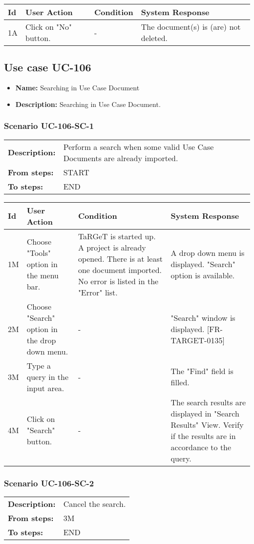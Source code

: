 \documentclass[a4paper,11pt]{article}
\newcommand{\bl}{\\ \hline}
\begin{document}
\begin{tabular}{|p{0.8in}|p{1.6in}|p{1.6in}|p{1.6in}|}
\hline
Id & User Action & Condition & System Response  \bl 
1A & Click on "No" button. & - & The document(s) is (are) not deleted. \bl 
\end{tabular}
\subsection*{Use case UC-106}
\begin{itemize}
\item {\bf Name: }Searching in Use Case Document
\item {\bf Description: }Searching in Use Case Document.
\end{itemize}
\subsubsection*{Scenario UC-106-SC-1}
\begin{tabular}{p{1in}p{4in}}
{\bf Description:} & Perform a search when some valid Use Case Documents are already imported. \\
{\bf From steps:} & START \\
{\bf To steps:} & END \\
\end{tabular}
 
\begin{tabular}{|p{0.8in}|p{1.6in}|p{1.6in}|p{1.6in}|}
\hline
Id & User Action & Condition & System Response  \bl 
1M & Choose "Tools" option in the menu bar. & TaRGeT is started up. A project is already opened. There is at least one document imported. No error is listed in the "Error" list. & A drop down menu is displayed. "Search" option is available. \bl 
2M & Choose "Search" option in the drop down menu. & - & "Search" window is displayed. [FR-TARGET-0135] \bl 
3M & Type a query in the input area. & - & The "Find" field is filled. \bl 
4M & Click on "Search" button. & - & The search results are displayed in "Search Results" View. Verify if the results are in accordance to the query. \bl 
\end{tabular}
\subsubsection*{Scenario UC-106-SC-2}
\begin{tabular}{p{1in}p{4in}}
{\bf Description:} & Cancel the search. \\
{\bf From steps:} & 3M \\
{\bf To steps:} & END \\
\end{tabular}
 
\end{document}

